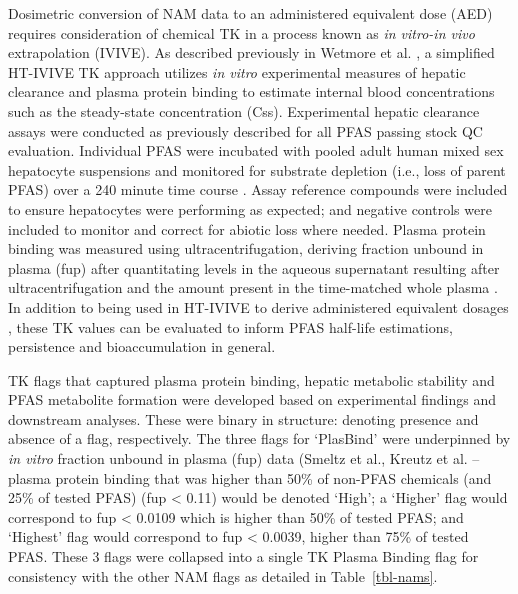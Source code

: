 \documentclass[
  super,
  preprint,
  3p]{elsarticle}
\begin{document}
Dosimetric conversion of NAM data to an administered equivalent dose
(AED) requires consideration of chemical TK in a process known as
\emph{in vitro-in vivo} extrapolation (IVIVE). As described previously
in Wetmore et al. \citep{wetmore_integration_2012}, a simplified
HT-IVIVE TK approach utilizes \emph{in vitro} experimental measures of
hepatic clearance and plasma protein binding to estimate internal blood
concentrations such as the steady-state concentration (Css).
Experimental hepatic clearance assays were conducted as previously
described \citep{wetmore_integration_2012} for all PFAS passing stock QC
evaluation. Individual PFAS were incubated with pooled adult human mixed
sex hepatocyte suspensions and monitored for substrate depletion (i.e.,
loss of parent PFAS) over a 240 minute time course
\citep{kreutz_category-based_2023, crizer2023vitro}. Assay reference
compounds were included to ensure hepatocytes were performing as
expected; and negative controls were included to monitor and correct for
abiotic loss where needed. Plasma protein binding was measured using
ultracentrifugation, deriving fraction unbound in plasma (fup) after
quantitating levels in the aqueous supernatant resulting after
ultracentrifugation and the amount present in the time-matched whole
plasma \citep{smeltz_plasma_2023, kreutz_category-based_2023}. In
addition to being used in HT-IVIVE to derive administered equivalent
dosages \citep{wetmore_incorporating_2015, paul_friedman_utility_2020},
these TK values can be evaluated to inform PFAS half-life estimations,
persistence and bioaccumulation in general.

TK flags that captured plasma protein binding, hepatic metabolic
stability and PFAS metabolite formation were developed based on
experimental findings and downstream analyses. These were binary in
structure: denoting presence and absence of a flag, respectively. The
three flags for `PlasBind' were underpinned by \emph{in vitro} fraction
unbound in plasma (fup) data (Smeltz et al., Kreutz et al.
\citep{smeltz_plasma_2023, kreutz_category-based_2023} -- plasma protein
binding that was higher than 50\% of non-PFAS chemicals (and 25\% of
tested PFAS) (fup \textless{} 0.11) would be denoted `High'; a `Higher'
flag would correspond to fup \textless{} 0.0109 which is higher than
50\% of tested PFAS; and `Highest' flag would correspond to fup
\textless{} 0.0039, higher than 75\% of tested PFAS. These 3 flags were
collapsed into a single TK Plasma Binding flag for consistency with the
other NAM flags as detailed in Table~\ref{tbl-nams}.
\end{document}
